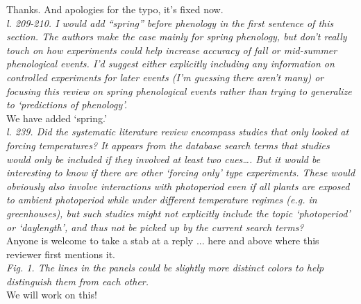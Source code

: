 \documentclass[11pt,letter]{article}
\begin{document}
Thanks. And apologies for the typo, it's fixed now.\\

\emph{l. 209-210. I would add “spring” before phenology in the first sentence of this section. The authors make the case mainly for spring phenology, but don’t really touch on how experiments could help increase accuracy of fall or mid-summer phenological events. I’d suggest either explicitly including any information on controlled experiments for later events (I’m guessing there aren’t many) or focusing this review on spring phenological events rather than trying to generalize to ‘predictions of phenology’.  }\\

We have added `spring.'\\

\emph{l. 239. Did the systematic literature review encompass studies that only looked at forcing temperatures? It appears from the database search terms that studies would only be included if they involved at least two cues…. But it would be interesting to know if there are other `forcing only’ type experiments. These would obviously also involve interactions with photoperiod even if all plants are exposed to ambient photoperiod while under different temperature regimes (e.g. in greenhouses), but such studies might not explicitly include the topic `photoperiod’ or `daylength’, and thus not be picked up by the current search terms? }\\

Anyone is welcome to take a stab at a reply ... here and above where this reviewer first mentions it.\\

\emph{Fig. 1. The lines in the panels could be slightly more distinct colors to help distinguish them from each other.}\\

We will work on this!


\end{document}

